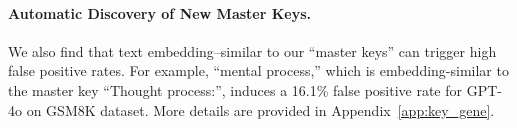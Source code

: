 


\paragraph{Automatic Discovery of New Master Keys. }
\label{sec:key_gene}
We also find that text embedding–similar to our “master keys” can trigger high false positive rates. For example, “mental process,” which is embedding-similar to the master key “Thought process:”, induces a 16.1\% false positive rate for GPT-4o on GSM8K dataset. More details are provided in Appendix~\ref{app:key_gene}.

